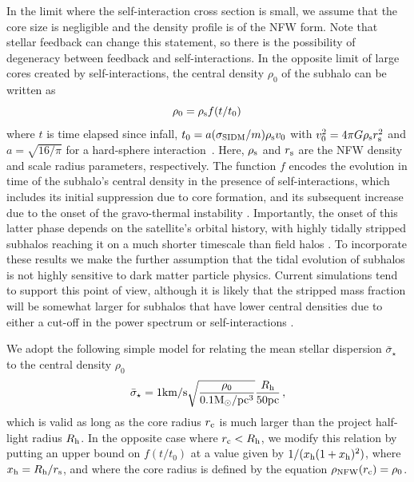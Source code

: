In the limit where the self-interaction cross section is small, we assume that the core size is negligible and the density profile is of the NFW form. Note that stellar feedback can change this statement, so there is the possibility of degeneracy between feedback and self-interactions. In the opposite limit of large cores created by self-interactions, the central density $\rho_0$ of the subhalo can be written as \citep{Nishikawa:2019lsc}
\begin{equation}
\rho_0=\rho_{\rm s} f(t/t_0)\,
\end{equation}
where $t$ is time elapsed since infall, $t_0 = a(\sigma_{\rm SIDM}/m)\rho_{\rm s} v_0$ with $v_0^2=4\pi G \rho_{\rm s} r_{\rm s}^2$ and $a=\sqrt{16/\pi}$ for a hard-sphere interaction~\citep{Balberg:2002ue}. Here, $\rho_{\rm s}$ and $r_{\rm s}$ are the NFW density and scale radius parameters, respectively. The function $f$ encodes the evolution in time of the subhalo's central density in the presence of self-interactions, which includes its initial suppression due to core formation, and its subsequent increase due to the onset of the gravo-thermal instability \citep{Ahn:2004xt}. Importantly, the onset of this latter phase depends on the satellite's orbital history, with highly tidally stripped subhalos reaching it on a much shorter timescale than field halos \citep{Nishikawa:2019lsc}. To incorporate these results we make the further assumption that the tidal evolution of subhalos is not highly sensitive to dark matter particle physics. Current simulations tend to support this point of view, although it is likely that the stripped mass fraction will be somewhat larger for subhalos that have lower central densities due to either a cut-off in the power spectrum or self-interactions \citep{Lovell:2013ola,Dooley:2016ajo}. 

We adopt the following simple model for relating the mean stellar dispersion $\bar{\sigma}_\star$ to the central density $\rho_0$ \citep{Wolf:2009tu}
\begin{equation}
\bar{\sigma}_\star = 1 {\rm km}/{\rm s} \sqrt{\frac{\rho_0}{0.1 {\rm M}_\odot/{\rm pc}^3}} \frac{R_{\rm h}}{50 {\rm pc}}\,,
\end{equation}
which is valid as long as the core radius $r_{\rm c}$ is much larger than the project half-light radius $R_{\rm h}$. In the opposite case where $r_{\rm c} < R_{\rm h}$, we modify this relation by putting an upper bound on $f(t/t_0)$ at a value given by $1/(x_{\rm h}(1+x_{\rm h})^2)$, where $x_{\rm h} = R_{\rm h}/r_{\rm s}$, and where the core radius is defined by the equation $\rho_{\rm NFW}(r_{\rm c}) = \rho_0$.   

